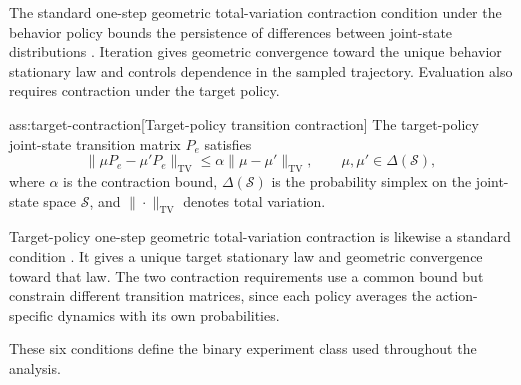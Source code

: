 \documentclass[11pt]{article}
\begin{document}
The standard one-step geometric total-variation contraction condition under the behavior policy bounds the persistence of differences between joint-state distributions \citep{HuWager2023}. Iteration gives geometric convergence toward the unique behavior stationary law and controls dependence in the sampled trajectory. Evaluation also requires contraction under the target policy.

\begin{assumptionv}{ass:target-contraction}[Target-policy transition contraction]
The target-policy joint-state transition matrix \(P_e\) satisfies
\[
\|\mu P_e-\mu'P_e\|_{\mathrm{TV}}
\le
\alpha\|\mu-\mu'\|_{\mathrm{TV}},
\qquad \mu,\mu'\in\Delta(\mathcal S),
\]
where \(\alpha\) is the contraction bound, \(\Delta(\mathcal S)\) is the probability simplex on the joint-state space \(\mathcal S\), and \(\|\cdot\|_{\mathrm{TV}}\) denotes total variation.
\end{assumptionv}

Target-policy one-step geometric total-variation contraction is likewise a standard condition \citep{HuWager2023}. It gives a unique target stationary law and geometric convergence toward that law. The two contraction requirements use a common bound but constrain different transition matrices, since each policy averages the action-specific dynamics with its own probabilities.

These six conditions define the binary experiment class  used throughout the analysis.
\end{document}
